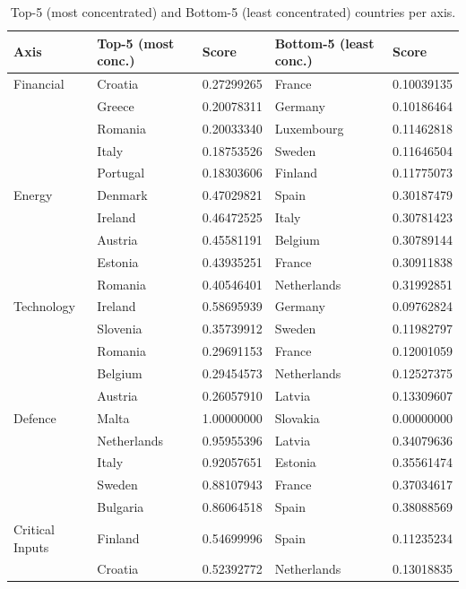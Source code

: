 \begin{table}[htbp]
\centering
\caption{Top-5 (most concentrated) and Bottom-5 (least concentrated) countries per axis.}
\label{tab:axis-top-bottom}
\footnotesize
\begin{tabular}{@{}lllll@{}}
\toprule
{\textbf{Axis}} & {\textbf{Top-5 (most conc.)}} & {\textbf{Score}} & {\textbf{Bottom-5 (least conc.)}} & {\textbf{Score}} \\
\midrule
  Financial & Croatia & 0.27299265 & France & 0.10039135 \\
   & Greece & 0.20078311 & Germany & 0.10186464 \\
   & Romania & 0.20033340 & Luxembourg & 0.11462818 \\
   & Italy & 0.18753526 & Sweden & 0.11646504 \\
   & Portugal & 0.18303606 & Finland & 0.11775073 \\
\addlinespace
  Energy & Denmark & 0.47029821 & Spain & 0.30187479 \\
   & Ireland & 0.46472525 & Italy & 0.30781423 \\
   & Austria & 0.45581191 & Belgium & 0.30789144 \\
   & Estonia & 0.43935251 & France & 0.30911838 \\
   & Romania & 0.40546401 & Netherlands & 0.31992851 \\
\addlinespace
  Technology & Ireland & 0.58695939 & Germany & 0.09762824 \\
   & Slovenia & 0.35739912 & Sweden & 0.11982797 \\
   & Romania & 0.29691153 & France & 0.12001059 \\
   & Belgium & 0.29454573 & Netherlands & 0.12527375 \\
   & Austria & 0.26057910 & Latvia & 0.13309607 \\
\addlinespace
  Defence & Malta & 1.00000000 & Slovakia & 0.00000000 \\
   & Netherlands & 0.95955396 & Latvia & 0.34079636 \\
   & Italy & 0.92057651 & Estonia & 0.35561474 \\
   & Sweden & 0.88107943 & France & 0.37034617 \\
   & Bulgaria & 0.86064518 & Spain & 0.38088569 \\
\addlinespace
  Critical Inputs & Finland & 0.54699996 & Spain & 0.11235234 \\
   & Croatia & 0.52392772 & Netherlands & 0.13018835 \\

\end{tabular}
\end{table}
